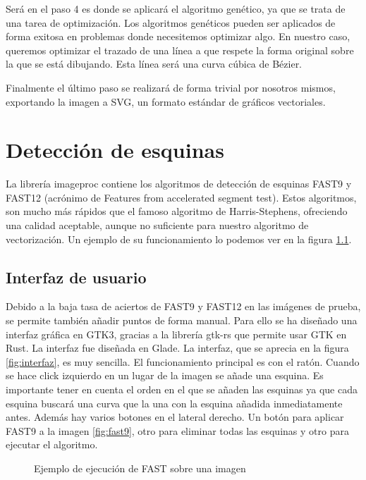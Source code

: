 \documentclass{report}
\begin{document}
Será en el paso 4 es donde se aplicará el algoritmo genético, ya que se trata de una tarea de 
optimización. Los algoritmos genéticos pueden ser aplicados de forma exitosa en problemas donde 
necesitemos optimizar algo. En nuestro caso, queremos optimizar el trazado de una línea a que 
respete la forma original sobre la que se está dibujando. Esta línea será una curva cúbica de Bézier.

Finalmente el último paso se realizará de forma trivial por nosotros mismos, 
exportando la imagen a SVG, un formato estándar de gráficos vectoriales.

\chapter{Detección de esquinas}
La librería imageproc contiene los algoritmos de detección de esquinas
FAST9 y FAST12 \cite{rosten_2006_machine} (acrónimo de Features from accelerated segment test). 
Estos algoritmos, son mucho más rápidos que el
 famoso algoritmo de Harris-Stephens, ofreciendo una calidad aceptable, aunque no suficiente para 
 nuestro algoritmo de vectorización. Un ejemplo de su funcionamiento lo podemos ver en la 
 figura \ref{fig:fast-png}.


\section{Interfaz de usuario}

Debido a la baja tasa de aciertos de FAST9 y FAST12 en las imágenes de prueba, se permite también
añadir puntos de forma manual. Para ello se ha diseñado una interfaz gráfica en GTK3, gracias a
la librería gtk-rs que permite usar GTK en Rust. La interfaz fue diseñada en Glade. La interfaz, 
que se aprecia en la figura \ref{fig:interfaz}, 
es muy sencilla. El funcionamiento principal es con el ratón. Cuando se hace click izquierdo en un
lugar de la imagen se añade una esquina. Es importante tener en cuenta el orden en el que se añaden las esquinas
ya que cada esquina buscará una curva que la una con la esquina añadida inmediatamente antes.
Además hay varios botones en el lateral derecho. Un botón para aplicar FAST9 a la imagen \ref{fig:fast9}, otro para eliminar 
todas las esquinas y otro para ejecutar el algoritmo.

\begin{figure}
	\caption{\label{fig:fast-png} Ejemplo de ejecución de FAST sobre una imagen}
\end{figure}
\end{document}
